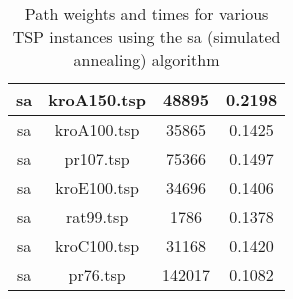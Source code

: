 \documentclass{article}
\begin{document}
\begin{center}
\begin{table}[h!]
\begin{tabular}{|c|c|c|c|}
			sa        & kroA150.tsp  & 48895       & 0.2198   \\ \hline
			sa        & kroA100.tsp  & 35865       & 0.1425   \\ \hline
			sa        & pr107.tsp    & 75366       & 0.1497   \\ \hline
			sa        & kroE100.tsp  & 34696       & 0.1406   \\ \hline
			sa        & rat99.tsp    & 1786        & 0.1378   \\ \hline
			sa        & kroC100.tsp  & 31168       & 0.1420   \\ \hline
			sa        & pr76.tsp     & 142017      & 0.1082   \\ \hline
		\end{tabular}
		\caption{Path weights and times for various TSP instances using the sa (simulated annealing) algorithm}
	\end{table}

\end{center}
\end{document}
